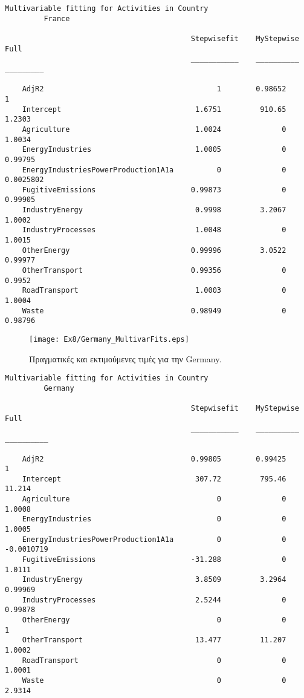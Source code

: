 \documentclass[11pt]{scrartcl} %
\begin{document}
\begin{Verbatim}[fontsize=\small]
Multivariable fitting for Activities in Country
 	 	 France

                                           Stepwisefit    MyStepwise      Full   
                                           ___________    __________    _________

    AdjR2                                        1        0.98652               1
    Intercept                               1.6751         910.65          1.2303
    Agriculture                             1.0024              0          1.0034
    EnergyIndustries                        1.0005              0         0.99795
    EnergyIndustriesPowerProduction1A1a          0              0       0.0025802
    FugitiveEmissions                      0.99873              0         0.99905
    IndustryEnergy                          0.9998         3.2067          1.0002
    IndustryProcesses                       1.0048              0          1.0015
    OtherEnergy                            0.99996         3.0522         0.99977
    OtherTransport                         0.99356              0          0.9952
    RoadTransport                           1.0003              0          1.0004
    Waste                                  0.98949              0         0.98796
\end{Verbatim}


\begin{figure}[H]
 
	\centering
	\texttt{[image: Ex8/Germany\_MultivarFits.eps]}	
\caption{Πραγματικές και εκτιμούμενες τιμές για την Germany.}
\label{fig:z86}
\end{figure}



\begin{Verbatim}[fontsize=\small]
Multivariable fitting for Activities in Country
 	 	 Germany

                                           Stepwisefit    MyStepwise       Full   
                                           ___________    __________    __________

    AdjR2                                  0.99805        0.99425                1
    Intercept                               307.72         795.46           11.214
    Agriculture                                  0              0           1.0008
    EnergyIndustries                             0              0           1.0005
    EnergyIndustriesPowerProduction1A1a          0              0       -0.0010719
    FugitiveEmissions                      -31.288              0           1.0111
    IndustryEnergy                          3.8509         3.2964          0.99969
    IndustryProcesses                       2.5244              0          0.99878
    OtherEnergy                                  0              0                1
    OtherTransport                          13.477         11.207           1.0002
    RoadTransport                                0              0           1.0001
    Waste                                        0              0           2.9314
\end{Verbatim}
\end{document}
